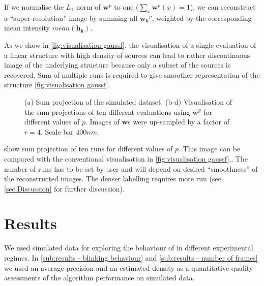 If we normalise the $L_1$ norm of $\bm{w}^p$ to one ($\sum_x \bm{w}^p(x)=1$), we can reconstruct a ``super-resolution'' image by summing all $\bm{w_k}^p$, weighted by the corresponding mean intensity $\unit{mean}(\bm{h_k})$. 

As we show in \autoref{fig:visualisation gaussf}\ccc, the visualisation of a single \inmf{} evaluation of a linear structure with high density of sources can lead to rather discontinuous image of the underlying structure because only a subset of the sources is recovered. Sum of multiple \inmf{} runs is required to give smoother representation of the structure \autoref{fig:visualisation gaussf}\ddd. 
%
\begin{figure}[!hbt]
	\newcommand{\sizef}{.48}			
	\newcommand{\widthfig}{1\textwidth}	
	\centering
	\caption{(a) Sum projection of the simulated dataset. (b-d) Visualisation of the sum projections of ten different \inmf{} evaluations using $\bm{w}^p$ for different values of $p$. Images of $\bm{w}$s were up-sampled by a factor of $r=4$. Scale bar $400 \unit{nm}$.}
	\label{fig:demo pow w result}	
\end{figure}

 show sum projection of ten \inmf{} runs for different values of $p$. This image can be compared with the conventional visualisation in \autoref{fig:visualisation gaussf}\ccc,\ddd. The number of \inmf{} runs has to be set by user and will depend on desired ``smoothness'' of the reconstructed images. The denser labelling requires more \inmf{} run (see \autoref{sec:Discussion} for further discussion). 

\clearpage
\section{Results \label{sec:results}}
We used simulated data for exploring the behaviour of \inmf{} in different experimental regimes. In \autoref{sub:results - blinking behaviour} and \ref{sub:results - number of frames} we used an average precision and an estimated density as a quantitative quality assessments of the algorithm performance on simulated data. 

